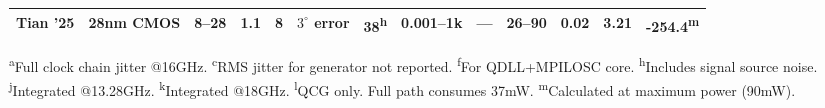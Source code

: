 \begin{table*}[h]
{\begin{tabular}{@{}l l c S[table-format=1.2] c c c S[table-format=2.1] S[table-format=1.3] S[table-format=1.2] c S[table-format=-3.1] S[table-format=-3.1] @{}}
  Tian '25 \cite{Tian2025ISSCC} & 28nm CMOS & 8--28 & 1.1 & 8 & $3^{\circ}$ error & 38\textsuperscript{h} & {0.001--1k} & {---} & {26--90} & 0.02 & 3.21 & -254.4\textsuperscript{m} \\

  \bottomrule
 \end{tabular}
}
\vspace{0.5em}
\begin{minipage}{\textwidth}
\footnotesize
 \textsuperscript{a}Full clock chain jitter @16GHz.
 \textsuperscript{c}RMS jitter for generator not reported.
 \textsuperscript{f}For QDLL+MPILOSC core.
 \textsuperscript{h}Includes signal source noise.
 \textsuperscript{j}Integrated @13.28GHz.
 \textsuperscript{k}Integrated @18GHz.
 \textsuperscript{l}QCG only. Full path consumes 37mW.
 \textsuperscript{m}Calculated at maximum power (90mW).
\end{minipage}
\end{table*}